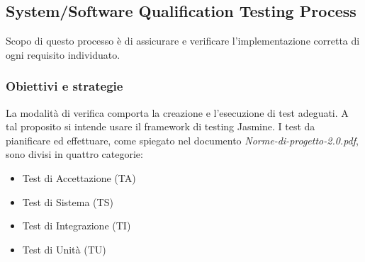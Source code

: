 \documentclass[a4paper,11pt]{article}
\begin{document}
\begin{itemize}
%

\subsection{System/Software Qualification Testing Process}
Scopo di questo processo è di assicurare e verificare l'implementazione corretta di ogni requisito individuato.
\subsubsection{Obiettivi e strategie}
La modalità di verifica comporta la creazione e l'esecuzione di test adeguati. A tal proposito si intende usare il framework di testing Jasmine.
I test da pianificare ed effettuare, come spiegato nel documento \textit{Norme-di-progetto-2.0.pdf}, sono divisi in quattro categorie:
\begin{itemize}
\item Test di Accettazione (TA)
\item Test di Sistema (TS)
\item Test di Integrazione (TI)
\item Test di Unità (TU)
\end{itemize}


\end{itemize}
\end{document}
